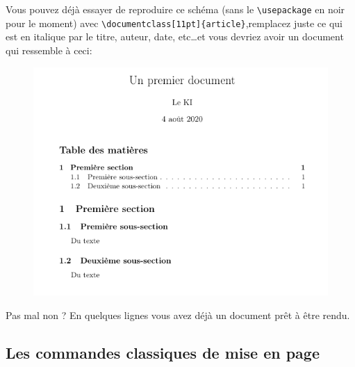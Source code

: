 \documentclass[11pt]{article}				%
\newcommand{\tb}{\textbackslash}
\begin{document}
Vous pouvez déjà essayer de reproduire ce schéma (sans le \texttt{\tb usepackage} en noir pour le moment) avec \texttt{\tb documentclass[11pt]\{article\}},remplacez juste ce qui est en italique par le titre, auteur, date, etc\dots et vous devriez avoir un document qui ressemble à ceci:
\clearpage
\begin{figure}
\begin{center}
	\includegraphics[scale=0.5]{ressources/frover.png}
\end{center}	

\end{figure}



Pas mal non ? En quelques lignes vous avez déjà un document prêt à être rendu.

\subsection{Les commandes classiques de mise en page}
\end{document}

